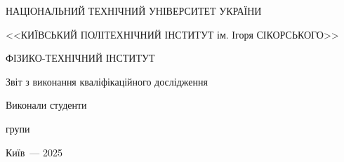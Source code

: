 \thispagestyle{empty}

\begin{center}
НАЦІОНАЛЬНИЙ ТЕХНІЧНИЙ УНІВЕРСИТЕТ УКРАЇНИ \par
<<КИЇВСЬКИЙ ПОЛІТЕХНІЧНИЙ ІНСТИТУТ ім. Ігоря СІКОРСЬКОГО>>\par
ФІЗИКО-ТЕХНІЧНИЙ ІНСТИТУТ\par

\vspace{40mm}
{\huge Звіт з виконання кваліфікаційного дослідження \par}

\huge\MakeUppercase{\textbf{\reportTitle}} \par
\end{center}

\vspace{20mm}
\begin{flushright}
Виконали студенти

групи \reportAuthorGroup

\reportAuthor

\vspace{15mm}

\end{flushright}

\vspace{20mm}
\begin{center}
{Київ~--- 2025}
\end{center}

\newpage
